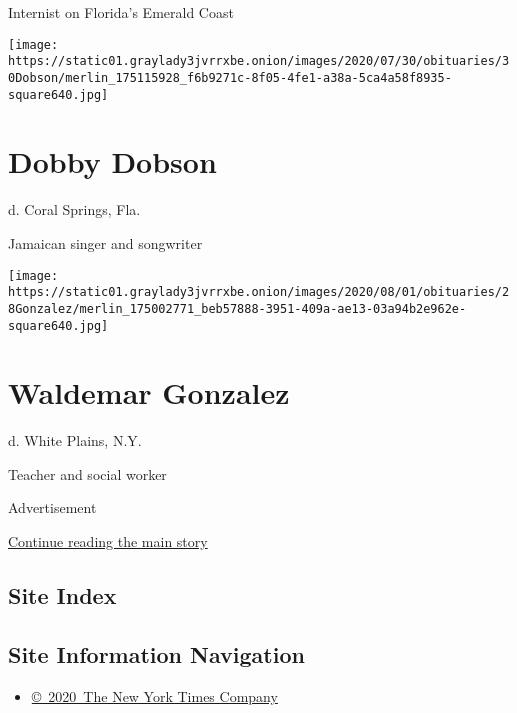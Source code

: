 Internist on Florida's Emerald Coast

\texttt{[image: https://static01.graylady3jvrrxbe.onion/images/2020/07/30/obituaries/30Dobson/merlin\_175115928\_f6b9271c-8f05-4fe1-a38a-5ca4a58f8935-square640.jpg]}

\hypertarget{dobby-dobson}{%
\section{Dobby Dobson}\label{dobby-dobson}}

d. Coral Springs, Fla.

Jamaican singer and songwriter

\texttt{[image: https://static01.graylady3jvrrxbe.onion/images/2020/08/01/obituaries/28Gonzalez/merlin\_175002771\_beb57888-3951-409a-ae13-03a94b2e962e-square640.jpg]}

\hypertarget{waldemar-gonzalez}{%
\section{Waldemar Gonzalez}\label{waldemar-gonzalez}}

d. White Plains, N.Y.

Teacher and social worker

Advertisement

\protect\hyperlink{after-bottom}{Continue reading the main story}

\hypertarget{site-index}{%
\subsection{Site Index}\label{site-index}}

\hypertarget{site-information-navigation}{%
\subsection{Site Information
Navigation}\label{site-information-navigation}}

\begin{itemize}
\tightlist
\item
  \href{https://help.nytimes3xbfgragh.onion/hc/en-us/articles/115014792127-Copyright-notice}{©~2020~The
  New York Times Company}
\end{itemize}

